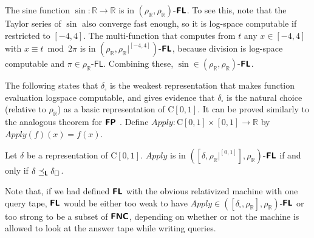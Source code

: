 \documentclass[envcountsect,envcountsame,orivec,oribibl]{llncs}
\newcommand{\R}{\mathbb R}
\newcommand{\classonefont}[1]{\mathsf{#1}}
\newcommand{\classFL}{\classonefont{FL}}
\newcommand{\classtwofont}[1]{\text{\bfseries \sffamily \upshape #1}}
\newcommand{\classFLtwo}{\classtwofont{FL}}
\newcommand{\classFNCtwo}{\classtwofont{FNC}}
\newcommand{\classFPtwo}{\classtwofont{FP}}
\newcommand{\deltabox}{\delta _\square}
\newcommand{\rhoR}{\rho _\R}
\newcommand{\rhoRunit}{\rho _\R|^{[0,1]}}
\newcommand{\classC}{\mathrm C}
\newcommand{\OpApply}{\mathit{Apply}}
\begin{document}


\begin{example}
\label{example: sine}
The sine function $\sin \colon \R \to \R$ is
in $(\rhoR, \rhoR)$-$\classFLtwo$.
To see this, note that 
the Taylor series of $\sin$ also converge fast enough,
so it is log-space computable if restricted to $[-4, 4]$.
The multi-function that computes from $t$
any $x \in [-4, 4]$ with $x \equiv t \bmod 2 \pi$ is
in $(\rhoR, \rhoR|^{[-4,4]})$-$\classFLtwo$, 
because division is log-space computable 
and $\pi \in \rhoR$-$\classFL$. 
Combining these, $\sin \in (\rhoR, \rhoR)$-$\classFLtwo$.
\end{example}

The following states that $\deltabox$ 
is the weakest representation that makes function evaluation 
logspace computable, 
and gives evidence that 
$\deltabox$ is the natural choice (relative to $\rhoR$)
as a basic representation of $\classC [0, 1]$. 
It can be proved similarly to the analogous theorem for $\classFPtwo$ 
\cite{kawamura11:_funct_space_repres_and_polyn_time_comput}. 
Define $\OpApply \colon \classC [0, 1] \times [0, 1] \to \R$ by 
$\OpApply (f) (x) = f (x)$. 

\begin{theorem}
 \label{theorem:apply-is-L-computable}
 Let $\delta$ be a representation of $\classC[0, 1]$.
 $\OpApply$ is in $([\delta, \rhoRunit], \rhoR)$-$\classFLtwo$ if
 and only if $\delta \transL \deltabox$.
\end{theorem}

Note that, 
if we had defined $\classFLtwo$ with the obvious relativized machine with one query tape,
$\classFLtwo$ would be either too weak 
to have $\OpApply \in ([\deltabox,\rhoR], \rhoR)$-$\classFLtwo$ or
too strong to be a subset of $\classFNCtwo$,
depending on whether or not the machine is allowed to look at the answer tape while writing queries.
\end{document}
